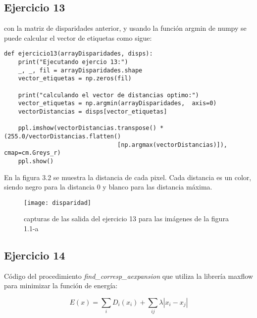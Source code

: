 \documentclass[paper=a4, fontsize=11pt]{scrartcl} %
\numberwithin{equation}{section} %
\numberwithin{figure}{section} %
\numberwithin{table}{section} %
\begin{document}
\subsection{Ejercicio 13}

con la matriz de disparidades anterior, y usando la función argmin de numpy se puede calcular el vector de etiquetas como sigue:

\begin{lstlisting}
def ejercicio13(arrayDisparidades, disps):
    print("Ejecutando ejercio 13:")
    _, _, fil = arrayDisparidades.shape
    vector_etiquetas = np.zeros(fil)

    print("calculando el vector de distancias optimo:")
    vector_etiquetas = np.argmin(arrayDisparidades,  axis=0)
    vectorDistancias = disps[vector_etiquetas]

    ppl.imshow(vectorDistancias.transpose() * (255.0/vectorDistancias.flatten()
    							[np.argmax(vectorDistancias)]), cmap=cm.Greys_r)
    ppl.show()
\end{lstlisting} 

En la figura 3.2 se muestra la distancia de cada pixel. Cada distancia es un color, siendo negro para la distancia 0 y blanco para las distancia máxima. 

\begin{figure}
	\centering
	\texttt{[image: disparidad]}
	\caption{capturas de las salida del ejercicio 13 para las imágenes de la figura 1.1-a}
	\label{fig:fig}
\end{figure}

\subsection{Ejercicio 14}

Código del procedimiento \textit{find\_corresp\_aexpansion} que utiliza la librería maxflow para minimizar la función de energía:

\begin{equation}
	E(x) = \sum_{i} D_i(x_i) + \sum_{ij} \lambda|x_i - x_j|
\end{equation}
\end{document}
